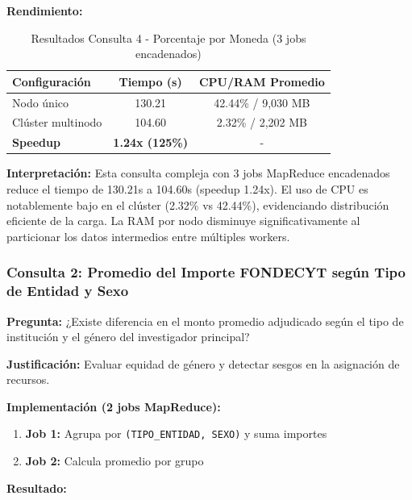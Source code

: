 \documentclass[12pt,a4paper]{article}
\begin{document}
\textbf{Rendimiento:}

\begin{table}[H]
\centering
\begin{tabular}{lcc}
\toprule
\textbf{Configuración} & \textbf{Tiempo (s)} & \textbf{CPU/RAM Promedio} \\
\midrule
Nodo único & 130.21 & 42.44\% / 9,030 MB \\
Clúster multinodo & 104.60 & 2.32\% / 2,202 MB \\
\midrule
\textbf{Speedup} & \textbf{1.24x (125\%)} & - \\
\bottomrule
\end{tabular}
\caption{Resultados Consulta 4 - Porcentaje por Moneda (3 jobs encadenados)}
\label{tab:consulta4_perf}
\end{table}

\textbf{Interpretación:} Esta consulta compleja con 3 jobs MapReduce encadenados reduce el tiempo de 130.21s a 104.60s (speedup 1.24x). El uso de CPU es notablemente bajo en el clúster (2.32\% vs 42.44\%), evidenciando distribución eficiente de la carga. La RAM por nodo disminuye significativamente al particionar los datos intermedios entre múltiples workers.

\subsubsection{Consulta 2: Promedio del Importe FONDECYT según Tipo de Entidad y Sexo}

\textbf{Pregunta:} ¿Existe diferencia en el monto promedio adjudicado según el tipo de institución 
y el género del investigador principal?

\textbf{Justificación:} Evaluar equidad de género y detectar sesgos en la asignación de recursos.

\textbf{Implementación (2 jobs MapReduce):}

\begin{enumerate}
    \item \textbf{Job 1:} Agrupa por \texttt{(TIPO\_ENTIDAD, SEXO)} y suma importes
    \item \textbf{Job 2:} Calcula promedio por grupo
\end{enumerate}

\textbf{Resultado:}
\end{document}
